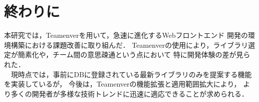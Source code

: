 \documentclass[main]{subfiles}
\begin{document}
\section{終わりに}
本研究では，Teamenverを用いて，急速に進化するWebフロントエンド
開発の環境構築における課題改善に取り組んだ．
Teamenverの使用により，ライブラリ選定が簡素化や，チーム間の意思疎通という点において
特に開発体験の差が見られた．\\
　現時点では，事前にDBに登録されている最新ライブラリのみを提案する機能を実装しているが，
今後は，Teamenverの機能拡張と適用範囲拡大により，
より多くの開発者が多様な技術トレンドに迅速に適応できることが求められる．
\end{document}
